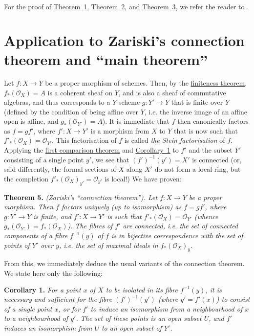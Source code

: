 \documentclass{article}
\newenvironment{itenv}[1]
  {\phantomsection\par\medskip\noindent\textbf{#1.}\itshape}
  {\medskip}
\newcommand{\scr}[1]{{\mathscr{#1}}}
\newcommand{\oldpage}[1]{\marginpar{\footnotesize$\Big\vert$ \textit{p.~#1}}}
\begin{document}
For the proof of \hyperref[theorem1]{Theorem~1}, \hyperref[theorem2]{Theorem~2}, and \hyperref[theorem3]{Theorem~3}, we refer the reader to \cite{1}.


\section{Application to Zariski's connection theorem and ``main theorem''}
\label{section4}

Let $f\colon X\to Y$ be a proper morphism of schemes.
Then, by the \hyperref[theorem1]{finiteness theorem}, $f_*(\scr{O}_X)=\underline{A}$ is a coherent sheaf on $Y$, and is also a sheaf of commutative algebras, and thus corresponds to a $Y$-scheme $g\colon Y'\to Y$ that is finite over $Y$ (defined by the condition of being affine over $Y$, i.e. the inverse image of an affine open is affine, and $g_*(\scr{O}_{Y'})=\underline{A}$).
It is immediate that $f$ then canonically factors as $f=gf'$, where $f'\colon X\to Y'$ is a morphism from $X$ to $Y$ that is now such that $f'_*(\scr{O}_X)=\scr{O}_{Y'}$.
This factorisation of $f$ is called \emph{the Stein factorisation} of $f$.
Applying the \hyperref[theorem2]{first comparison theorem} and \hyperref[theorem2corollary1]{Corollary~1} to $f'$ and the subset $Y'$ consisting of a single point $y'$, we see that $(f')^{-1}(y')=X'$ is connected (or, said differently, the formal sections of $X$ along $X'$ do not form a local ring, but the completion $f'_*(\scr{O}_X)_{y'}=\scr{O}_{y'}$ is local!)
We have proven:

\begin{itenv}{Theorem 5}
\label{theorem5}
  \emph{(Zariski's ``connection theorem'').}
  Let $f\colon X\to Y$ be a proper morphism.
  Then $f$ factors uniquely (up to isomorphism) as $f=gf'$, where $g\colon Y'\to Y$ is finite, and $f'\colon X\to Y'$ is such that $f'_*(\scr{O}_X)=\scr{O}_{Y'}$ (whence $g_*(\scr{O}_{Y'})=f_*(\scr{O}_X)$).
  The fibres of $f'$ are connected,
\oldpage{182-06}
  i.e. the set of connected components of a fibre $f^{-1}(y)$ of $f$ is in bijective correspondence with the set of points of $Y'$ over $y$, i.e. the set of maximal ideals in $f_*(\scr{O}_X)_y$.
\end{itenv}

From this, we immediately deduce the usual variants of the connection theorem.
We state here only the following:

\begin{itenv}{Corollary 1}
\label{theorem5corollary1}
  For a point $x$ of $X$ to be isolated in its fibre $f^{-1}(y)$, it is necessary and sufficient for the fibre $(f')^{-1}(y')$ (where $y'=f'(x)$) to consist of a single point $x$, or for $f'$ to induce an isomorphism from a neighbourhood of $x$ to a neighbourhood of $y'$.
  The set of these points is an open subset $U$, and $f'$ induces an isomorphism from $U$ to an open subset of $Y'$.
\end{itenv}
\end{document}
